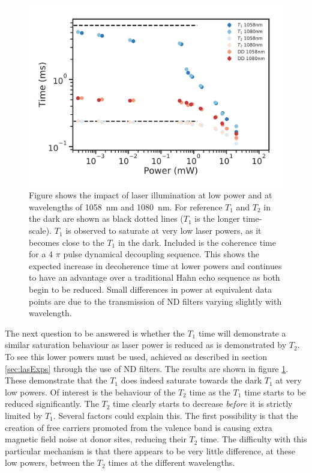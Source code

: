\begin{figure}
\centering
\includegraphics[width=0.8\columnwidth]{Figures/T1vsT2vsDD1058and1080.pdf}
\caption[Low power $T_1$ and $T_2$ comparison]{Figure shows the impact of laser illumination at low power and at wavelengths of 1058~nm and 1080~nm. For reference $T_1$ and $T_2$ in the dark are shown as black dotted lines ($T_1$ is the longer time-scale). $T_1$ is observed to saturate at very low laser powers, as it becomes close to the $T_1$ in the dark. Included is the coherence time for a 4 $\pi$ pulse dynamical decoupling sequence. This shows the expected increase in decoherence time at lower powers and continues to have an advantage over a traditional Hahn echo sequence as both begin to be reduced. Small differences in power at equivalent data points are due to the transmission of ND filters varying slightly with wavelength.}
\label{fig:t1vst2lowpow}
\end{figure}
The next question to be answered is whether the $T_1$ time will demonstrate a similar saturation behaviour as laser power is reduced as is demonstrated by $T_2$.
To see this lower powers must be used, achieved as described in section \ref{sec:lasExps} through the use of ND filters.
The results are shown in figure \ref{fig:t1vst2lowpow}.
These demonstrate that the $T_1$ does indeed saturate towards the dark $T_1$ at very low powers.
Of interest is the behaviour of the $T_2$ time as the $T_1$ time starts to be reduced significantly.
The $T_2$ time clearly starts to decrease \textit{before} it is strictly limited by $T_1$.
Several factors could explain this.
The first possibility is that the creation of free carriers promoted from the valence band is causing extra magnetic field noise at donor sites, reducing their $T_2$ time.
The difficulty with this particular mechanism is that there appears to be very little difference, at these low powers, between the $T_2$ times at the different wavelengths.
